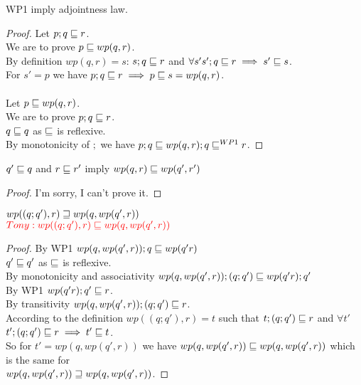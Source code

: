 \documentclass{article}
\begin{document}
\begin{theorem}
WP1 imply adjointness law.
\end{theorem}

\begin{proof}
Let $p; q \sqsubseteq r$.\\
We are to prove $p \sqsubseteq wp(q, r)$.\\
By definition $wp(q, r) = s$: $s; q \sqsubseteq r$ and $\forall s' s'; q \sqsubseteq r \implies s' \sqsubseteq s$.\\
For $s' = p$ we have $p; q \sqsubseteq r \implies p \sqsubseteq s = wp(q, r)$.\\
\\
Let $p \sqsubseteq wp(q, r)$.\\
We are to prove $p; q \sqsubseteq r$.\\
$q \sqsubseteq q$ as $\sqsubseteq$ is reflexive.\\
By monotonicity of $;$ we have $p; q \sqsubseteq wp(q, r); q \sqsubseteq^{WP1} r$.
\end{proof}


\begin{theorem}[wp monotonicity]
$q' \sqsubseteq q$ and $r \sqsubseteq r'$ imply $wp(q, r) \sqsubseteq wp(q', r')$
\end{theorem}

\begin{proof}
I'm sorry, I can't prove it.
\end{proof}

\begin{theorem}[Stepwise wp]
$wp((q; q'), r) \sqsupseteq wp(q, wp(q', r))$\\
$\color{red} Tony: wp((q; q'), r) \sqsubseteq wp(q, wp(q', r))$
\end{theorem}

\begin{proof}
By WP1 $wp(q, wp(q', r)); q \sqsubseteq wp(q' r)$\\
$q' \sqsubseteq q'$ as $\sqsubseteq$ is reflexive.\\
By monotonicity and associativity $wp(q, wp(q', r)); (q; q') \sqsubseteq wp(q' r); q'$\\
By WP1 $wp(q' r); q' \sqsubseteq r$.\\
By transitivity $wp(q, wp(q', r)); (q; q') \sqsubseteq r$.\\
According to the definition $wp((q; q'), r) = t$ such that $t; (q; q') \sqsubseteq r$ and $\forall t'$ $t'; (q; q') \sqsubseteq r \implies t' \sqsubseteq t$.\\
So for $t' = wp(q, wp(q', r))$ we have $wp(q, wp(q', r)) \sqsubseteq wp(q, wp(q', r))$ which is the same for\\
$wp(q, wp(q', r)) \sqsupseteq wp(q, wp(q', r))$.
\end{proof}
\end{document}
